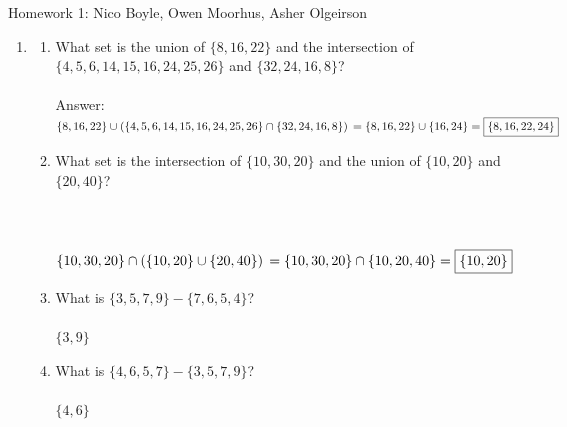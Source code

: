 \documentclass[12pt]{article}
\begin{document}
  
\pagestyle{empty}
Homework 1: Nico Boyle, Owen Moorhus,  Asher Olgeirson


\begin{enumerate}





\item
\begin{enumerate}
\item What set is the union of  $\{8,16, 22\}$ and the intersection of  $\{4,5,6,14,15,16,24,25,26\}$ and  $\{32,24,16,8\}$?\\\\


{\color{blue}
Answer: \\ 
$ 
 \{8,16,22\} \cup \left(\{4,5,6,14,15,16,24,25,26\} \cap \{32,24,16,8\}\right) \\
= \{8,16,22\} \cup \{16,24\} \\
= \boxed{\{8,16,22,24\}}
$
} 



\item What set is the intersection of  $\{10, 30, 20\}$ and the union of  $\{10, 20\}$ and  $\{20, 40\}$?\\\\\\\\

  {\color{blue}
  $\{10,30,20\}\cap \left(\{10,20\}\cup\{20,40\}\right)\\
  = \{10,30,20 \} \cap \{10,20,40\} \\
  = \boxed{\{10,20 \}}
  $
  }

\item What is $\{3,5,7,9\} - \{7,6,5,4\}$?\\\\
 
  {\color{blue}
$
\boxed{\{3,9\}}
$
}

\item What is $\{4,6,5,7\} - \{3,5,7,9\}$?\\\\
  {\color{blue}
$
\boxed{\{ 4,6 \}}
$
  }


\end{enumerate}
\end{enumerate}
\end{document}
